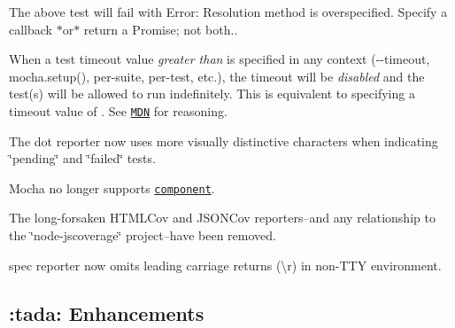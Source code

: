 The above test will fail with {\ttfamily Error\+: Resolution method is overspecified. Specify a callback $\ast$or$\ast$ return a Promise; not both.}.
\begin{DoxyItemize}
\item When a test timeout value {\itshape greater than} {} is specified in any context ({\ttfamily -\/-\/timeout}, {\ttfamily mocha.\+setup()}, per-\/suite, per-\/test, etc.), the timeout will be {\itshape disabled} and the test(s) will be allowed to run indefinitely. This is equivalent to specifying a timeout value of {}. See \href{https://developer.mozilla.org/docs/Web/API/WindowTimers/setTimeout#Maximum_delay_value}{\tt M\+DN} for reasoning.
\item The {\ttfamily dot} reporter now uses more visually distinctive characters when indicating \char`\"{}pending\char`\"{} and \char`\"{}failed\char`\"{} tests.
\item Mocha no longer supports \href{https://www.npmjs.com/package/component}{\tt component}.
\item The long-\/forsaken {\ttfamily H\+T\+M\+L\+Cov} and {\ttfamily J\+S\+O\+N\+Cov} reporters--and any relationship to the \char`\"{}node-\/jscoverage\char`\"{} project--have been removed.
\item {\ttfamily spec} reporter now omits leading carriage returns ({\ttfamily \textbackslash{}r}) in non-\/\+T\+TY environment.
\end{DoxyItemize}

\subsection*{\+:tada\+: Enhancements}


